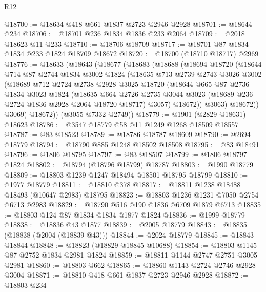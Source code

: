\begin{lexlean}{R12}
\begin{coremodule}
@18700 := @18634 @418 @661 @1837 @2723 @2946 @2928
@18701 := @18644 @234
@18706 := @18701 @236 @1834 @1836 @233 @2064
@18709 := @2018 @18623 @11 @233
@18710 := @18706 @18709
@18717 := @18701 @87 @1834 @1834 @233 @1824 @18709 @18672
@18720 := @18700 (@18710 @18717) @2969
@18776 := @18633
    (@18643
      (@18677
        (@18683
          (@18688
            (@18694
              @18720
              (@18644
                @714
                @87
                @2744
                @1834
                @3002
                @1824
                (@18635
                  @713
                  @2739
                  @2743
                  @3026
                  @3002
                  (@18689
                    @712
                    @2724
                    @2738
                    @2928
                    @3025
                    @18720
                    (@18644
                      @665
                      @87
                      @2736
                      @1834
                      @3023
                      @1824
                      (@18635
                        @664
                        @2726
                        @2735
                        @3044
                        @3023
                        (@18689 @236 @2724 @1836 @2928 @2064 @18720 @18717)
                        @3057)
                      @18672))
                  @3063)
                @18672))
            @3069)
          @18672))
      (@3055 @7332 @2749))
@18779 := @1901 (@2829 @18631) @18623
@18786 := @3547 @18779 @58 @11 @1249 @1268 @18509 @18557
@18787 := @83 @18523
@18789 := @18786 @18787 @18609
@18790 := @2694 @18779
@18794 := @18790 @885 @1248 @18502 @18508
@18795 := @83 @18491
@18796 := @1806 @18795
@18797 := @83 @18507
@18799 := @1806 @18797 @1824
@18802 := @18794 (@18796 @18799) @18787
@18803 := @1990 @18779
@18809 := @18803 @1239 @1247 @18494 @18501 @18795 @18799
@18810 := @1977 @18779
@18811 := @18810 @378
@18817 := @18811 @1238 @18488 @18493 (@10647 @2983) @18795
@18823 := @18803 @1236 @1231 @7050 @2754 @6713 @2983
@18829 := @18790 @516 @190 @1836 @6709 @1879 @6713
@18835 := @18803 @124 @87 @1834 @1834 @1877 @1824
@18836 := @1999 @18779
@18838 := @18836 @43 @1877
@18839 := @2005 @18779
@18843 := @18835 (@18838 (@2004 (@18839 @43)))
@18844 := @2024 @18779
@18845 := @18843 @18844
@18848 := @18823 (@18829 @18845 @10688)
@18854 := @18803 @1145 @87 @2752 @1834 @2981 @1824
@18859 := @18811 @1144 @2747 @2751 @3005 @2981
@18860 := @18803 @662
@18865 := @18860 @1143 @2724 @2746 @2928 @3004
@18871 := @18810 @418 @661 @1837 @2723 @2946 @2928
@18872 := @18803 @234

\end{coremodule}
\end{lexlean}
